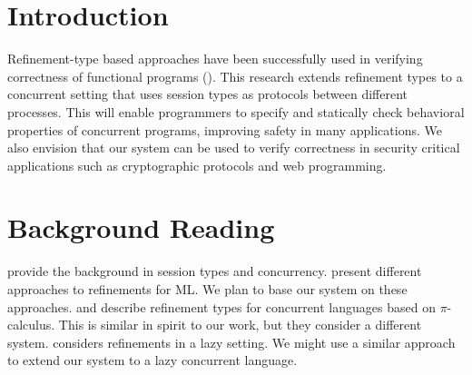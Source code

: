 \documentclass[11pt,twoside]{article}
\title{\mytitle}
\author{Josh Acay \\ \texttt{cacay@cmu.edu}
		\and
		\textbf{Thesis Advisor} \\ Frank Pfenning}
\date{\today}
\begin{document}
\maketitle

\begin{abstract}
We propose to develop  a refinement system for SALL, a concurrent functional language based on session-typed message-passing, that allow the specification of behavioral properties of concurrent programs. We aim for a system that is expressive enough to specify linear capabilities and security protocols while retaining useful properties such as decidability of type inference.

We plan to implement a prototype and demonstrate the usefulness of our system through examples. We hope that our system is able to enhance safety with minimal annotation burden on the programmer. Finally, we might adapt our system to an imperative language, and suggest future work for a lazy setting.
\end{abstract}

\section{Introduction}

Refinement-type based approaches have been successfully used in verifying correctness of functional programs (\cite{Freeman91, Xi98, Rondon08, Vazou14}). This research extends refinement types to a concurrent setting that uses session types as protocols between different processes. This will enable programmers to specify and statically check behavioral properties of concurrent programs, improving safety in many applications. We also envision that our system can be used to verify correctness in security critical applications such as cryptographic protocols and web programming.

\section{Background Reading}

\cite{Griffith14un, Toninho13esop, Caires10concur} provide the background in session types and concurrency. \cite{Freeman91, Xi98, Rondon08} present different approaches to refinements for ML. We plan to base our system on these approaches. \cite{Franco14} and \cite{Gordon09} describe refinement types for concurrent languages based on $\pi$-calculus. This is similar in spirit to our work, but they consider a different system. \cite{Vazou14} considers refinements in a lazy setting. We might use a similar approach to extend our system to a lazy concurrent language.
\end{document}

